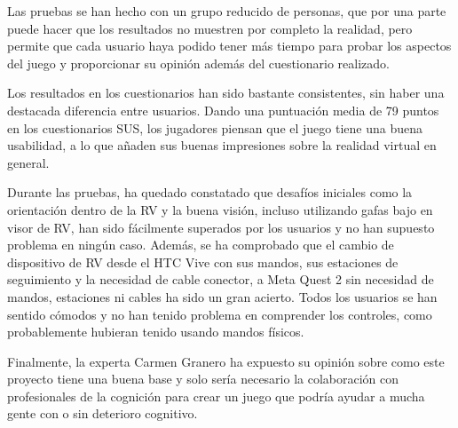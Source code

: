 Las pruebas se han hecho con un grupo reducido de personas, que por una parte puede hacer que los resultados no muestren por completo la realidad, pero permite que cada usuario haya podido tener más tiempo para probar los aspectos del juego y proporcionar su opinión además del cuestionario realizado. 

Los resultados en los cuestionarios han sido bastante consistentes, sin haber una destacada diferencia entre usuarios. Dando una puntuación media de 79 puntos en los cuestionarios SUS, los jugadores piensan que el juego tiene una buena usabilidad, a lo que añaden sus buenas impresiones sobre la realidad virtual en general.

Durante las pruebas, ha quedado constatado que desafíos iniciales como la orientación dentro de la RV y la buena visión, incluso utilizando gafas bajo en visor de RV, han sido fácilmente superados por los usuarios y no han supuesto problema en ningún caso. Además, se ha comprobado que el cambio de dispositivo de RV desde el HTC Vive con sus mandos, sus estaciones de seguimiento y la necesidad de cable conector, a Meta Quest 2 sin necesidad de mandos, estaciones ni cables ha sido un gran acierto. Todos los usuarios se han sentido cómodos y no han tenido problema en comprender los controles, como probablemente hubieran tenido usando mandos físicos.

Finalmente, la experta Carmen Granero ha expuesto su opinión sobre como este proyecto tiene una buena base y solo sería necesario la colaboración con profesionales de la cognición para crear un juego que podría ayudar a mucha gente con o sin deterioro cognitivo.
